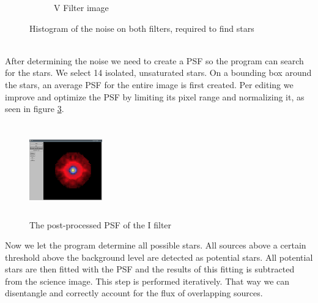 \begin{figure}[h]
\begin{subfigure}{0.45\textwidth}
	\caption{V Filter image}
	\label{noise_star_V}
	\end{subfigure}
	\caption{Histogram of the noise on both filters, required to find stars}
	\label{noise_star}
\end{figure} 
\vspace{3mm}\\
After determining the noise we need to create a PSF so the program can search for the stars. We select 14 isolated, unsaturated stars. On a bounding box around the stars, an average PSF for the entire image is first created. Per editing we improve and optimize the PSF  by limiting its pixel range and normalizing it, as seen in figure \ref{PSF_post}. \\
\begin{figure}
	\centering
	\includegraphics[width=0.28\textwidth ,height=4cm]{report_pictures/PSF_I_postprocessed.png}
	\caption{The post-processed PSF of the I filter}
	\label{PSF_post}
	\vspace{-15pt}
\end{figure}
Now we let the program determine all possible stars. All sources above a certain threshold above the background level are detected as potential stars. All potential stars are then fitted with the PSF and the results of this fitting is subtracted from the science image. This step is performed iteratively. That way we can disentangle and correctly account for the flux of overlapping sources.

